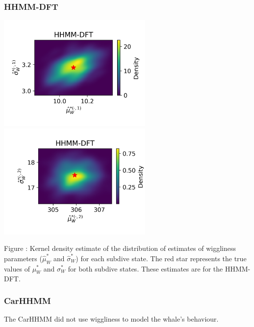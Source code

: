 \documentclass{article}
\begin{document}
        \subsubsection{HHMM-DFT}
        \begin{center}
        \includegraphics[width=3in]{../Plots/hhmm_FV_uncorr_MLE_density_FoVeDBA_0_0.png}
        \includegraphics[width=3in]{../Plots/hhmm_FV_uncorr_MLE_density_FoVeDBA_0_1.png}
        \end{center}
        
        \noindent Figure : Kernel density estimate of the distribution of estimates of wiggliness parameters ($\hat \mu^*_W$ and $\hat \sigma^*_W$) for each subdive state. The red star represents the true values of $\mu^*_W$ and $\sigma^*_W$ for both subdive states. These estimates are for the HHMM-DFT.
        \addtocounter{fignum}{1}
        
        \subsubsection{CarHHMM}
        The CarHHMM did not use wiggliness to model the whale's behaviour.
        
\end{document}
